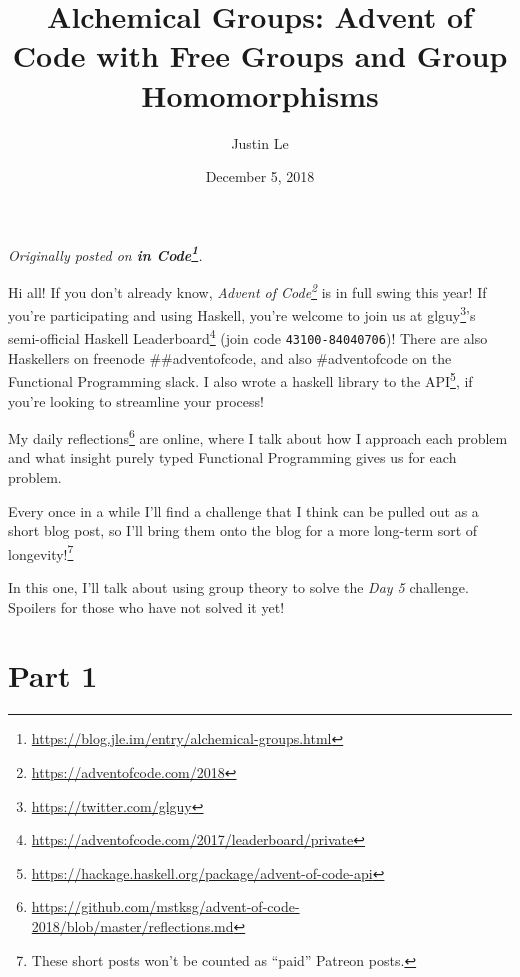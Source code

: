\documentclass[]{article}
\title{Alchemical Groups: Advent of Code with Free Groups and Group Homomorphisms}
\author{Justin Le}
\date{December 5, 2018}
\renewcommand{\href}[2]{#2\footnote{\url{#1}}}
\begin{document}
\maketitle

\emph{Originally posted on
\textbf{\href{https://blog.jle.im/entry/alchemical-groups.html}{in Code}}.}

Hi all! If you don't already know,
\emph{\href{https://adventofcode.com/2018}{Advent of Code}} is in full swing
this year! If you're participating and using Haskell, you're welcome to join us
at \href{https://twitter.com/glguy}{glguy}'s semi-official
\href{https://adventofcode.com/2017/leaderboard/private}{Haskell Leaderboard}
(join code \texttt{43100-84040706})! There are also Haskellers on freenode
\#\#adventofcode, and also \#adventofcode on the Functional Programming slack. I
also wrote a
\href{https://hackage.haskell.org/package/advent-of-code-api}{haskell library to
the API}, if you're looking to streamline your process!

My
\href{https://github.com/mstksg/advent-of-code-2018/blob/master/reflections.md}{daily
reflections} are online, where I talk about how I approach each problem and what
insight purely typed Functional Programming gives us for each problem.

Every once in a while I'll find a challenge that I think can be pulled out as a
short blog post, so I'll bring them onto the blog for a more long-term sort of
longevity!\footnote{These short posts won't be counted as ``paid'' Patreon
  posts.}

In this one, I'll talk about using group theory to solve the \emph{Day 5}
challenge. Spoilers for those who have not solved it yet!

\hypertarget{part-1}{%
\section{Part 1}\label{part-1}}
\end{document}
